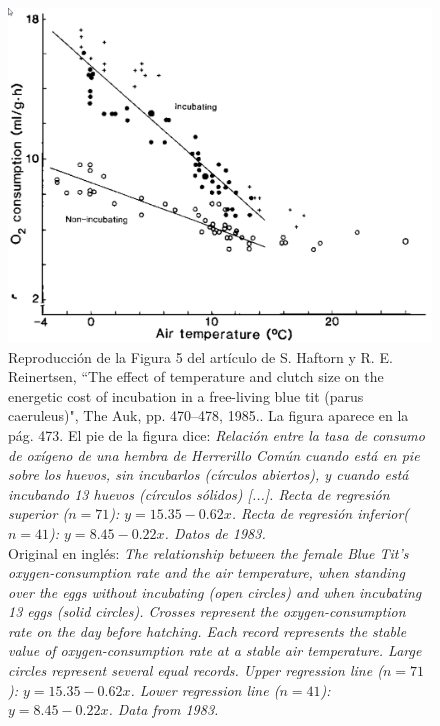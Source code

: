 \begin{figure}[p]
\begin{center}
\includegraphics[width=13cm]{../fig/Cap10-Figura05HaftornReinertsenHerrerillos.png}
\caption[caption]{Reproducción de la Figura 5 del artículo \cite{haftorn1985effect} de S. Haftorn y R. E. Reinertsen, ``The effect of temperature and clutch size on the energetic cost of incubation in a free-living blue tit (parus caeruleus)", The Auk, pp. 470–478, 1985.. La figura aparece en la  pág. 473. El pie de la figura dice: {\em\small Relación entre la tasa de consumo de oxígeno de una hembra de {\em Herrerillo Común} cuando está en pie sobre los huevos, sin incubarlos (círculos abiertos), y cuando está incubando 13 huevos (círculos sólidos) [...]. Recta de regresión superior ($n=71$): $y=15.35-0.62x$. Recta de regresión inferior($n=41$): $y=8.45-0.22x$. Datos de 1983.}
\\\hspace{\textwidth}
Original en inglés: {\small\em The relationship between the female Blue Tit's oxygen-consumption rate and the air temperature, when standing over the eggs without incubating (open circles) and when incubating 13 eggs (solid circles). Crosses represent the oxygen-consumption rate on the day before hatching. Each record represents the stable value of oxygen-consumption rate at a stable air temperature. Large circles represent several equal records. Upper regression line ($n=71$): $y=15.35-0.62x$. Lower regression line ($n=41$): $y=8.45-0.22x$. Data from 1983.}
}
\label{cap10:fig:Herrerillo}
\end{center}
\end{figure}

